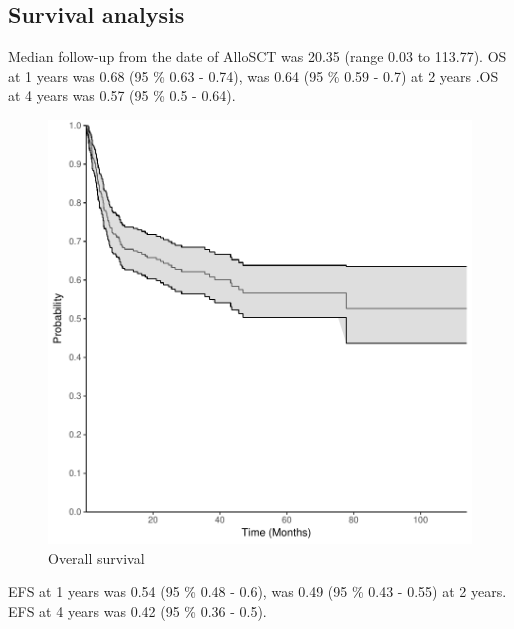 \documentclass[a4paper,11pt] {article}
\begin{document}
\subsection{Survival analysis}
Median follow-up from the date of AlloSCT was 20.35 (range 0.03 to 113.77). OS at 1 years was 0.68 (95 \% 0.63 - 0.74), was 0.64 (95 \% 0.59 - 0.7) at 2 years
.OS at 4 years was 0.57 (95 \% 0.5 - 0.64).
\begin{figure}[h]
\begin{center}
\includegraphics{Rapport-fig1}
\end{center}
\caption{Overall survival}
\label{fig1}
\end{figure}

\pagebreak
EFS at 1 years was 0.54 (95 \% 0.48 - 0.6), was 0.49 (95 \% 0.43 - 0.55) at 2 years. EFS at 4 years was 0.42 (95 \% 0.36 - 0.5).
\end{document}
